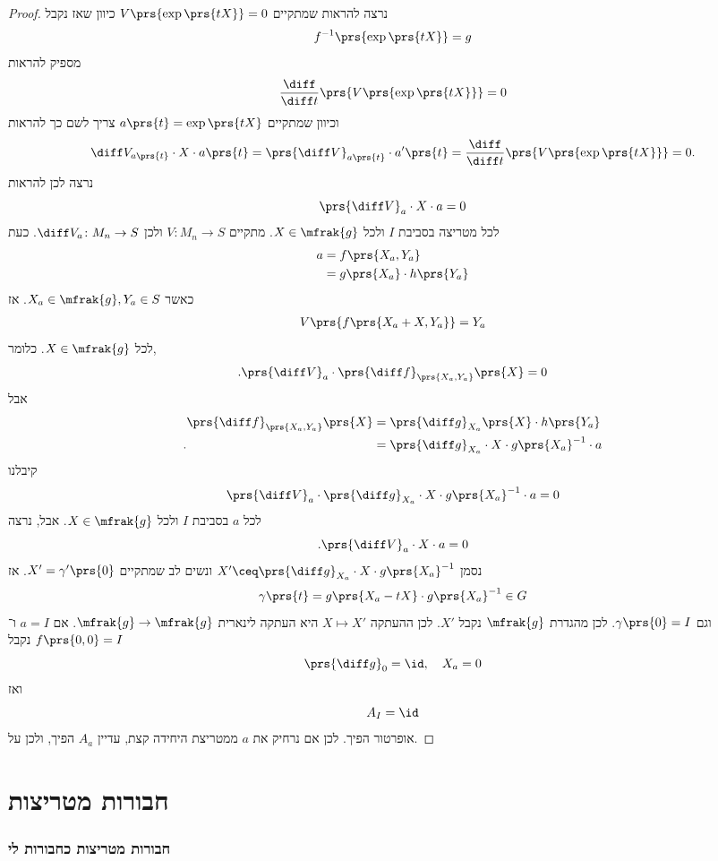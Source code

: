\documentclass[10pt, twoside]{book}
\begin{document}
\begin{proof}
נרצה להראות שמתקיים
$V\prs{\exp\prs{tX}} = 0$
כיוון שאז נקבל
\[f^{-1}\prs{\exp\prs{tX}} = g\]
מספיק להראות
\[\frac{\diff}{\diff t} \prs{V \prs{\exp\prs{tX}}} = 0\]
וכיוון שמתקיים
$a\prs{t} = \exp\prs{tX}$
צריך לשם כך להראות
\[\diff V_{a\prs{t}} \cdot X \cdot a\prs{t} = \prs{\diff V}_{a\prs{t}} \cdot a'\prs{t} = \frac{\diff}{\diff t} \prs{V \prs{\exp \prs{tX}}} = 0 \text{.}\]
נרצה לכן להראות
\[\prs{\diff V}_a \cdot X \cdot a = 0\]
לכל מטריצה בסביבת
$I$
ולכל
$X \in \mfrak{g}$.
מתקיים
$V \colon M_n \to S$
ולכן
$\diff V_a \colon M_n \to S$.
כעת
\begin{align*}
a &= f\prs{X_a, Y_a}
\\&=
g\prs{X_a} \cdot h\prs{Y_a}
\end{align*}
כאשר
$X_a \in \mfrak{g}, Y_a \in S$.
אז
\begin{align*}
V\prs{f\prs{X_a + X, Y_a}} = Y_a
\end{align*}
לכל
$X \in \mfrak{g}$.
כלומר,
\[\text{.} \prs{\diff V}_a \cdot \prs{\diff f}_{\prs{X_a, Y_a}} \prs{X} = 0\]
אבל
\begin{align*}
\prs{\diff f}_{\prs{X_a, Y_a}}\prs{X} &= \prs{\diff g}_{X_a} \prs{X} \cdot h\prs{Y_a}
\\\text{.} \hphantom{\prs{\diff f}_{\prs{X_a, Y_a}}\prs{X}}&=
\prs{\diff g}_{X_a} \cdot X \cdot g\prs{X_a}^{-1} \cdot a  
\end{align*}
קיבלנו
\[\prs{\diff V}_a \cdot \prs{\diff g}_{X_a} \cdot X \cdot g\prs{X_a}^{-1} \cdot a = 0\]
לכל
$a$
בסביבת
$I$
ולכל
$X \in \mfrak{g}$.
אבל, נרצה
\[\text{.}\prs{\diff V}_a \cdot X \cdot a = 0\]
נסמן
$X' \ceq \prs{\diff g}_{X_a} \cdot X \cdot g\prs{X_a}^{-1}$
ונשים לב שמתקיים
$X' = \gamma'\prs{0}$.
אז
\[\gamma\prs{t} = g\prs{X_a - tX} \cdot g\prs{X_a}^{-1} \in G\]
וגם
$\gamma\prs{0} = I$.
לכן מהגדרת
$\mfrak{g}$
נקבל
$X'$.
לכן ההעתקה
$X \mapsto X'$
היא העתקה לינארית
$\mfrak{g} \to \mfrak{g}$.
אם
$a = I$
ו־%
$f\prs{0,0} = I$
נקבל
\[\prs{\diff g}_0 = \id, \quad X_a = 0\]
ואז
\[A_I = \id\]
אופרטור הפיך.
לכן אם נרחיק את
$a$
ממטריצת היחידה קצת, עדיין
$A_a$
הפיך, ולכן על.
\end{proof}

\chapter{חבורות מטריצות}

\subsection{חבורות מטריצות כחבורות לי}
\end{document}
